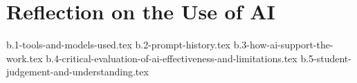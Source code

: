 \section{Reflection on the Use of AI}

{b.1-tools-and-models-used.tex}
{b.2-prompt-history.tex}
{b.3-how-ai-support-the-work.tex}
{b.4-critical-evaluation-of-ai-effectiveness-and-limitations.tex}
{b.5-student-judgement-and-understanding.tex}
